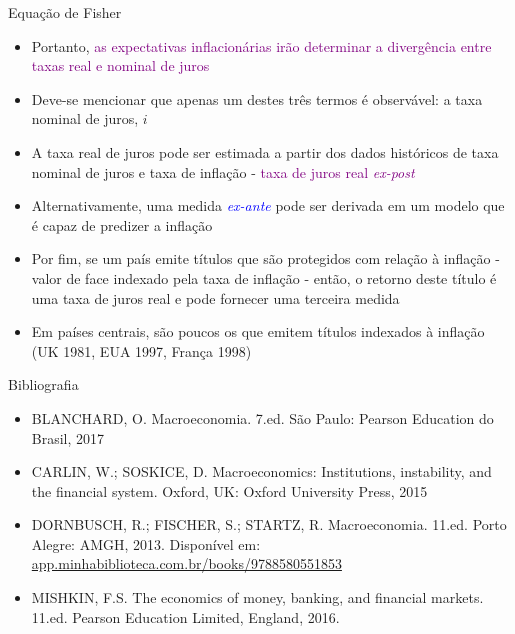 \documentclass[10pt]{beamer}
\begin{document}
\begin{frame}{Equação de Fisher}
    \begin{itemize}
        \item Portanto, \textcolor{purple}{as expectativas inflacionárias irão determinar a divergência entre taxas real e nominal de juros}\bigskip

        \item Deve-se mencionar que apenas um destes três termos é observável: a taxa nominal de juros, $i$\bigskip

        \item A taxa real de juros pode ser estimada a partir dos dados históricos de taxa nominal de juros e taxa de inflação - \textcolor{purple}{taxa de juros real \emph{ex-post}}\bigskip

        \item Alternativamente, uma medida \textcolor{blue}{\emph{ex-ante}} pode ser derivada em um modelo que é capaz de predizer a inflação\bigskip

        \item Por fim, se um país emite títulos que são protegidos com relação à inflação - valor de face indexado pela taxa de inflação - então, o retorno deste título é uma taxa de juros real e pode fornecer uma terceira medida\bigskip

        \item Em países centrais, são poucos os que emitem títulos indexados à inflação (UK 1981, EUA 1997, França 1998) \hyperlink{voltar}{}
    \end{itemize}
\end{frame}

\begin{frame}{ Bibliografia}
    \begin{itemize}
        \item BLANCHARD, O. Macroeconomia. 7.ed. São Paulo: Pearson Education do Brasil, 2017\medskip        
        \item CARLIN, W.; SOSKICE, D. Macroeconomics: Institutions, instability, and the financial system. Oxford, UK: Oxford University Press, 2015\medskip
        \item DORNBUSCH, R.; FISCHER, S.; STARTZ, R. Macroeconomia. 11.ed. Porto Alegre: AMGH, 2013. Disponível em: \href{https://app.minhabiblioteca.com.br/books/9788580551853}{app.minhabiblioteca.com.br/books/9788580551853}\medskip
        \item MISHKIN, F.S. The economics of money, banking, and financial markets. 11.ed. Pearson Education Limited, England, 2016.
    \end{itemize}
\end{frame}
\end{document}
